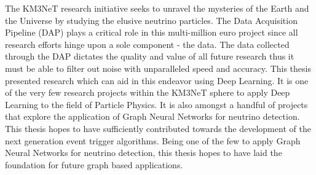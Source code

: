 The KM3NeT research initiative seeks to unravel the mysteries of the
Earth and the Universe by studying the elusive neutrino particles. The
Data Acquisition Pipeline (DAP) plays a critical role in this
multi-million euro project since all research efforts hinge upon a
sole component - the data. The data collected through the DAP dictates
the quality and value of all future research thus it must be able to
filter out noise with unparalleled speed and accuracy. This thesis
presented research which can aid in this endeavor using Deep Learning.
It is one of the very few research projects within the KM3NeT sphere
to apply Deep Learning to the field of Particle Physics. It is also
amongst a handful of projects that explore the application of Graph
Neural Networks for neutrino detection. This thesis hopes to have
sufficiently contributed towards the development of the next
generation event trigger algorithms. Being one of the few to apply
Graph Neural Networks for neutrino detection, this thesis hopes to
have laid the foundation for future graph based applications.

